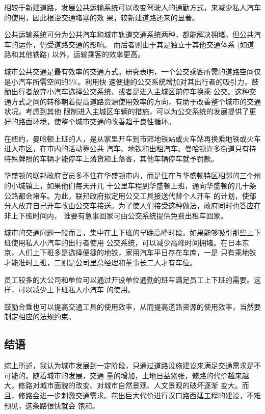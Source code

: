 ﻿\documentclass[11pt,a4paper,onecolumn]{article}
\begin{document}
相较于新建道路，发展公共运输系统可以改变驾驶人的通勤方式，来减少私人汽车的使用，因此根治交通堵塞的效
果，较新建道路还来的显著。

公共运输系统可分为公共汽车和城市轨道交通系统两种，都能解决拥堵。但公共汽车的运作，仍受道路交通的影响。
而后者则由于其是独立于其他交通体系 (如道路和其他铁路) 以外，运输乘客的效率更高。

城市公共交通是最有效率的交通方式。研究表明，一个公交乘客所需的道路空间仅是小汽车所需空间的5\%。利用快
速便捷的公交系统增加对其出行者的吸引力，鼓励出行者放弃小汽车选择公交系统，或者是进入主城区前停车换乘
公交。这种交通方式之间的转移朝着提高道路资源使用效率的方向，有助于改善整个城市的交通状况。考虑到其他
限制进入主城区车辆的措施，可以为公交系统的发展提供了更好的路面环境，使整个城市交通的改善趋于良性循环。

在纽约，曼哈顿上班的人，是从家里开车到市郊地铁站或火车站再换乘地铁或火车进入市区，在市内的活动靠公共
汽车、地铁和出租汽车。曼哈顿许多街道只有持特殊牌照的车辆才能停车上落货和上落客，其他车辆停车就予罚款。

华盛顿的联邦政府官员多不住在华盛顿市内，而是住在与华盛顿特区相邻的三个州的小城镇上，如果他们每天开几
十公里车程到华盛顿上班，通向华盛顿的几十条公路都会堵车。为此，联邦政府拟定用公交工具接送代替个人开车
的计划，使部分人放弃自己开车改由公交车接送。为了使人们接受这种做法，政府同时也答应在非上下班时间内，
谁要有急事回家可由公交系统提供免费出租车回家。

城市的交通问题一般而言，集中在上下班的早晚高峰时段。如果能够吸引那些上下班使用私人小汽车的出行者使用
公交系统，可以减少高峰时间拥堵。在日本东京，人们上下班多是选择便捷的地铁，家用汽车平日存在车库，一是
只有乘地铁才能准时上班，二则是公司里总经理和董事长二人才有车位。

员工较多的大公司和单位可以通过开设单位通勤的班车满足员工上下班的需要。这样，可以减少上下班私人小汽车
的使用。

鼓励合乘也可以提高交通工具的使用效率，从而提高道路资源的使用效率，当然要制定相应的法规约束。

\subsection{结语}

综上所述，我认为城市发展到一定阶段，只通过道路设施建设来满足交通需求是不可能的。随着城市的发展，交通
量的增加，土地日益紧张，修路的代价越来越大，修路对城市面貌的改变、对城市自然景观、人文景观的破坏逐渐
变大。而且，修路会进一步刺激交通需求。花出巨大代价进行汉口路西延工程的建设，不难预见，这条路很快就会
饱和。
\end{document}
